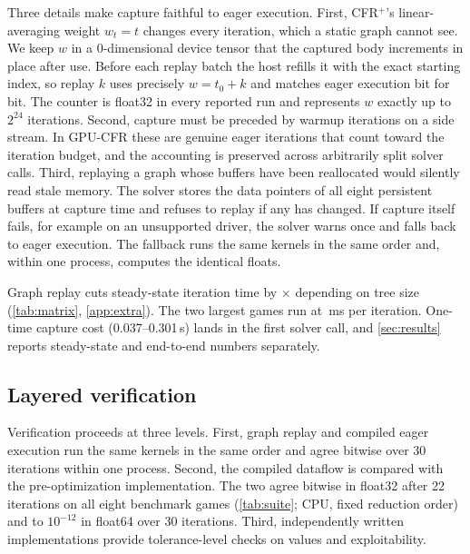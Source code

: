 Three details make capture faithful to eager execution. First, CFR$^{+}$'s
linear-averaging weight $w_t = t$ changes every iteration, which a static graph
cannot see. We keep $w$ in a 0-dimensional device tensor that the captured body
increments in place after use. Before each replay batch the host refills it with the
exact starting index, so replay $k$ uses precisely $w = t_0 + k$ and matches eager
execution bit for bit. The counter is float32 in every reported run and represents
$w$ exactly up to $2^{24}$ iterations. Second, capture must be preceded by warmup
iterations on a side stream. In GPU-CFR these are genuine eager iterations that count
toward the iteration budget, and the accounting is preserved across arbitrarily split
solver calls. Third, replaying a graph whose buffers have been reallocated would
silently read stale memory. The solver stores the data pointers of all eight
persistent buffers at capture time and refuses to replay if any has changed. If
capture itself fails, for example on an unsupported driver, the solver warns once and
falls back to eager execution. The fallback runs the same kernels in the same order
and, within one process, computes the identical floats.

Graph replay cuts steady-state iteration time by \eagerGraphRange$\times$
depending on tree size (\cref{tab:matrix}, \cref{app:extra}). The two largest games
run at \graphMsTwoLargest\,ms per iteration. One-time capture cost
(0.037--0.301\,s) lands in the first solver call, and \cref{sec:results} reports
steady-state and end-to-end numbers separately.

\subsection{Layered verification}
\label{sec:correctness}

Verification proceeds at three levels. First, graph replay and compiled eager
execution run the same kernels in the same order and agree bitwise over 30 iterations
within one process.
Second, the compiled dataflow is compared with the pre-optimization implementation.
The two agree bitwise in float32 after 22 iterations on all eight benchmark games
(\cref{tab:suite}; CPU, fixed reduction order) and to $10^{-12}$ in float64 over 30
iterations. Third, independently written implementations provide tolerance-level
checks on values and exploitability.

